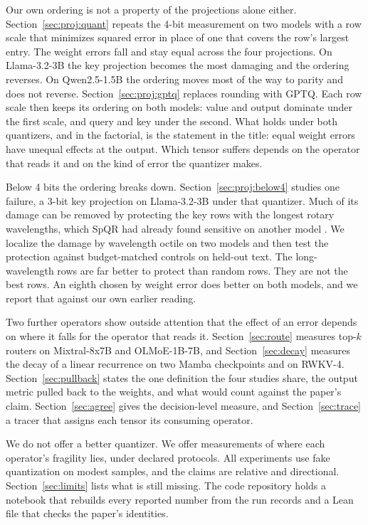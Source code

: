 \documentclass[journal]{IEEEtran}
\begin{document}
Our own ordering is not a property of the projections alone either.
Section~\ref{sec:proj:quant} repeats the 4-bit measurement on two models with a row scale that
minimizes squared error in place of one that covers the row's largest entry. The weight errors
fall and stay equal across the four projections. On Llama-3.2-3B the key projection becomes the
most damaging and the ordering reverses. On Qwen2.5-1.5B the ordering moves most of the way to
parity and does not reverse. Section~\ref{sec:proj:gptq} replaces rounding with GPTQ. Each row
scale then keeps its ordering on both models: value and output dominate under the first scale,
and query and key under the second. What holds under both quantizers, and in the factorial, is the statement in the title:
equal weight errors have unequal effects at the output. Which tensor suffers depends on the
operator that reads it and on the kind of error the quantizer makes.

Below 4 bits the ordering breaks down. Section~\ref{sec:proj:below4} studies one failure, a
3-bit key projection on Llama-3.2-3B under that quantizer. Much of its damage can be removed by
protecting the key rows with the longest rotary wavelengths,
which SpQR had already found sensitive on another model \citep{dettmers2024spqr}. We localize
the damage by wavelength octile on two models and then test the protection against
budget-matched controls on held-out text. The long-wavelength rows are far better to protect
than random rows. They are not the best rows. An eighth chosen by weight error does better on
both models, and we report that against our own earlier reading.

Two further operators show outside attention that the effect of an error depends on where
it falls for the operator that reads it. Section~\ref{sec:route} measures
top-$k$ routers on Mixtral-8x7B and OLMoE-1B-7B, and Section~\ref{sec:decay} measures the decay
of a linear recurrence on two Mamba checkpoints and on RWKV-4. Section~\ref{sec:pullback} states the one definition the four studies share, the output
metric pulled back to the weights, and what would count against the paper's claim.
Section~\ref{sec:agree} gives the decision-level measure, and Section~\ref{sec:trace} a
tracer that assigns each tensor its consuming operator.

We do not offer a better quantizer. We offer measurements of where each operator's fragility
lies, under declared protocols. All experiments use fake quantization on modest samples, and the
claims are relative and directional. Section~\ref{sec:limits} lists what is still missing. The
code repository holds a notebook that rebuilds every reported number from the run records and a
Lean file that checks the paper's identities.
\end{document}
